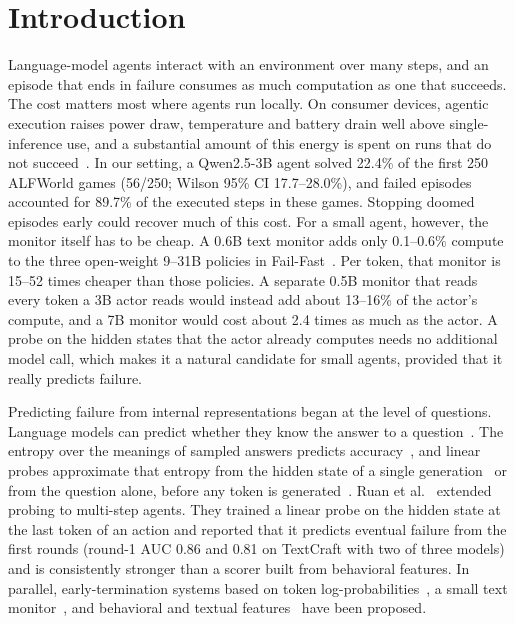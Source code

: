 \documentclass[11pt]{article}
\begin{document}
\section{Introduction}
Language-model agents interact with an environment over many steps, and an episode that ends in failure consumes as much computation as one that succeeds. The cost matters most where agents run locally.
On consumer devices, agentic execution raises power draw, temperature and battery drain well above single-inference use, and a substantial amount of this energy is spent on runs that do not succeed~\cite{pham2026agentstop}.
In our setting, a Qwen2.5-3B agent solved 22.4\% of the first 250 ALFWorld games (56/250; Wilson 95\% CI 17.7--28.0\%), and failed episodes accounted for 89.7\% of the executed steps in these games.
Stopping doomed episodes early could recover much of this cost. For a small agent, however, the monitor itself has to be cheap. A 0.6B text monitor adds only 0.1--0.6\% compute to the three open-weight 9--31B policies in Fail-Fast~\cite{wang2026failfast}.
Per token, that monitor is 15--52 times cheaper than those policies. A separate 0.5B monitor that reads every token a 3B actor reads would instead add about 13--16\% of the actor's compute, and a 7B monitor would cost about 2.4 times as much as the actor.
A probe on the hidden states that the actor already computes needs no additional model call, which makes it a natural candidate for small agents, provided that it really predicts failure.

Predicting failure from internal representations began at the level of questions. Language models can predict whether they know the answer to a question~\cite{kadavath2022know}. The entropy over the meanings of sampled answers predicts accuracy~\cite{kuhn2023semantic},
and linear probes approximate that entropy from the hidden state of a single generation~\cite{kossen2024sep} or from the question alone, before any token is generated~\cite{moreno2026noanswer}. Ruan et al.~\cite{ruan2026doomed} extended probing to multi-step agents.
They trained a linear probe on the hidden state at the last token of an action and reported that it predicts eventual failure from the first rounds (round-1 AUC 0.86 and 0.81 on TextCraft with two of three models)
and is consistently stronger than a scorer built from behavioral features. In parallel, early-termination systems based on token log-probabilities~\cite{pham2026agentstop}, a small text monitor~\cite{wang2026failfast}, and behavioral and textual features~\cite{shi2026earlyeval} have been proposed.
\end{document}
